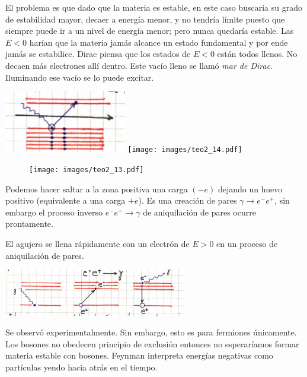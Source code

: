 \documentclass[10pt,oneside]{CBFT_book}
\begin{document}
El problema es que dado que la materia es estable, en este caso buscaría su grado de estabilidad mayor,
decaer a energía menor, y no tendría límite puesto que siempre puede ir a un nivel de energía menor; pero
nunca quedaría estable.
Las $E<0$ harían que la materia jamás alcance un estado fundamental y por ende jamás se estabilice.
Dirac piensa que los estados de $E<0$ están todos llenos. No decaen más electrones allí dentro. 
Este vacío lleno se llamó {\it mar de Dirac}. Iluminando ese vacío se lo puede excitar.

\includegraphics[width=0.4\textwidth]{images/fig_ft2_energias_negativas_2.jpg}
\texttt{[image: images/teo2\_14.pdf]}

\begin{figure}[htb]
	\begin{center}
	\texttt{[image: images/teo2\_13.pdf]}
	\end{center}
	\caption{}
\end{figure} 

Podemos hacer saltar a la zona positiva una carga $(-e)$ dejando un huevo positivo (equivalente a una carga 
$+e$). Es una creación de pares $\gamma \to e^-e^+$, sin embargo el proceso inverso $ e^-e^+ \to \gamma$ de 
aniquilación de pares ocurre prontamente.

El agujero se llena rápidamente con un electrón de $ E > 0 $ en un proceso de aniquilación de pares.

\includegraphics[width=0.6\textwidth]{images/fig_ft2_energias_negativas_3.jpg}


Se observó experimentalmente.
Sin embargo, esto es para fermiones únicamente.
Los bosones no obedecen principio de exclusión entonces no esperaríamos formar materia estable con bosones.
Feynman interpreta energías negativas como partículas yendo hacia atrás en el tiempo.
\end{document}
